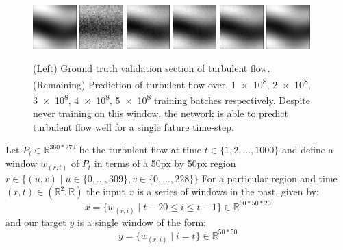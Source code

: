 \documentclass[10pt,letterpaper]{article}
\begin{document}
\begin{figure}
	\begin{center}
		\includegraphics[width=0.15\textwidth]{images/prediction/labe.png}
		\includegraphics[width=0.15\textwidth]{images/prediction/5.png}
		\includegraphics[width=0.15\textwidth]{images/prediction/10.png}
		\includegraphics[width=0.15\textwidth]{images/prediction/15.png}
		\includegraphics[width=0.15\textwidth]{images/prediction/20.png}
		\includegraphics[width=0.15\textwidth]{images/prediction/25.png}
		\caption{\small (Left) Ground truth validation section of turbulent flow. (Remaining) Prediction of turbulent flow over, \num{1e+8}, \num{2e+8}, \num{3e+8}, \num{4e+8}, \num{5e+8} training batches respectively. Despite never training on this window, the network is able to predict turbulent flow well for a single future time-step.}
		\label{training}
	\end{center}	
\end{figure}



Let $P_t \in \mathbb{R}^{360*279} $ be the turbulent flow at time $t \in \{1, 2, ..., 1000\}$ and define a window $w_{(r, t)}$ of $P_t$ in terms of a 50px by 50px region $r \in \{(u,v) \mid u \in \{0, ..., 309\}, v \in \{0, ...,  228\}\}$ 
For a particular region and time $(r,t) \in (\mathbb{R}^2,\mathbb{R})$ the input $x$ is a series of windows in the past, given by:
 $$x = \{w_{(r,i)} \mid t-20 \leq i \leq t-1 \} \in \mathbb{R}^{50*50*20}$$ and our target $y$ is a single window of the form: $$y = \{w_{(r,i)} \mid i = t  \} \in \mathbb{R}^{50*50}$$
\end{document}
